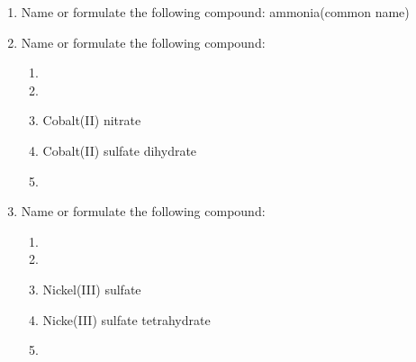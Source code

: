 \documentclass[main.tex]{subfiles}
\begin{document}
\begin{multicols*}{2}
\begin{enumerate}

\item  Name or formulate the following compound: ammonia(common name)
\begin{enumerate}[label=(\alph*)]
\end{enumerate}






\item  Name or formulate the following compound:
\begin{enumerate}[label=(\alph*)]
\item  {}
\item  {}
\item  Cobalt(II) nitrate
\item  Cobalt(II) sulfate dihydrate
\item {}
\end{enumerate}

\item  Name or formulate the following compound:
\begin{enumerate}[label=(\alph*)]
\item  {}
\item  {}
\item  Nickel(III) sulfate
\item  Nicke(III) sulfate tetrahydrate
\item {}
\end{enumerate}




\restoregeometry
\end{enumerate}
\end{multicols*}
\pagecolor{green!10}\afterpage{\nopagecolor}\newpage
\end{document}

